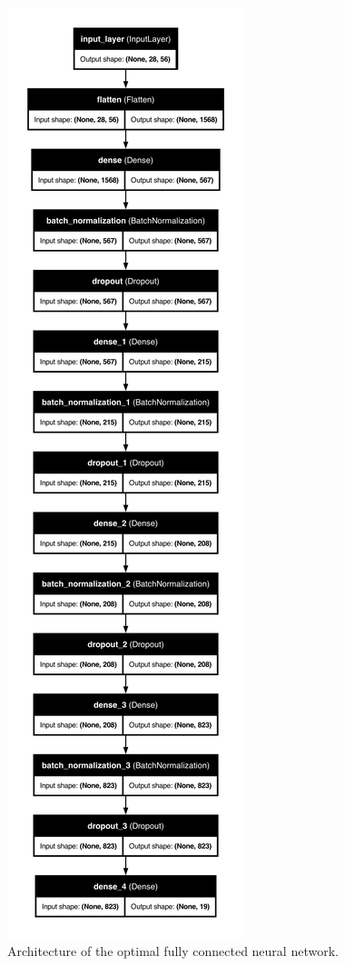 \documentclass{article}
\begin{document}
\begin{figure}[!htbp]
    \centering
    \includegraphics[width=0.42\linewidth]{./images/best_nn_architecture.pdf}
    \caption{Architecture of the optimal fully connected neural network.}
\label{fig:nn}
\end{figure}
\end{document}
